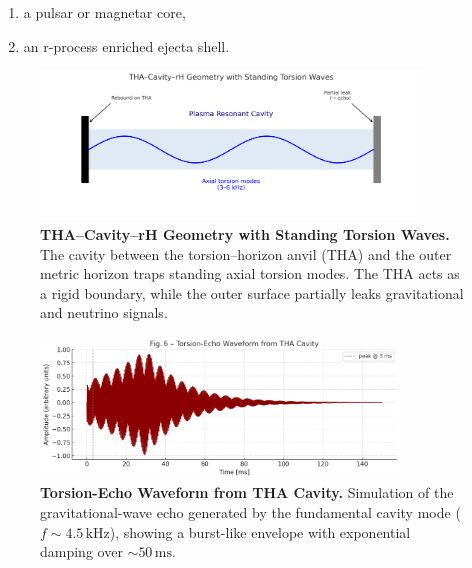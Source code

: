 \documentclass{article}
\begin{document}
\begin{enumerate}[label=(\alph*)]
  \item a pulsar or magnetar core,
  \item an r-process enriched ejecta shell.
\end{enumerate}

\begin{figure}[ht!]
\centering
\includegraphics[width=0.9\textwidth]{THF_cavity_geometry.png}
\caption{\textbf{THA–Cavity–rH Geometry with Standing Torsion Waves.}
The cavity between the torsion–horizon anvil (THA) and the outer metric horizon
traps standing axial torsion modes. The THA acts as a rigid boundary,
while the outer surface partially leaks gravitational and neutrino signals.}
\label{fig:THF-cavity}
\end{figure}

\begin{figure}[ht!]
\centering
\includegraphics[width=0.85\textwidth]{THF_echo_waveform.png}
\caption{\textbf{Torsion-Echo Waveform from THA Cavity.}
Simulation of the gravitational-wave echo generated by the fundamental cavity mode
($f \sim 4.5\,\mathrm{kHz}$), showing a burst-like envelope with exponential damping
over \(\sim50\,\mathrm{ms}\).}
\label{fig:THF-echo}
\end{figure}
\end{document}
